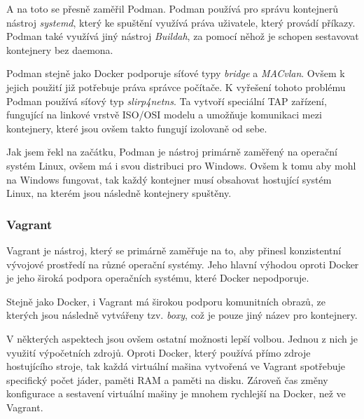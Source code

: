 A na toto se přesně zaměřil Podman. Podman používá pro správu kontejnerů nástroj \textit{systemd}, který ke spuštění využívá práva uživatele, který provádí příkazy. Podman také využívá jiný nástroj \textit{Buildah}, za pomocí něhož je schopen sestavovat kontejnery bez daemona. \cite{podman}\cite{podman_vs_docker}

Podman stejně jako Docker podporuje síťové typy \textit{bridge} a \textit{MACvlan}. Ovšem k jejich použití již potřebuje práva správce počítače. K vyřešení tohoto problému Podman používá síťový typ \textit{slirp4netns}. Ta vytvoří speciální TAP zařízení, fungující na linkové vrstvě ISO/OSI modelu a umožňuje komunikaci mezi kontejnery, které jsou ovšem takto fungují izolovaně od sebe. \cite{podman_network}

Jak jsem řekl na začátku, Podman je nástroj primárně zaměřený na operační systém Linux, ovšem má i svou distribuci pro Windows. Ovšem k tomu aby mohl na Windows fungovat, tak každý kontejner musí obsahovat hostující systém Linux, na kterém jsou následně kontejnery spuštěny. \cite{podman_vs_docker}

\subsubsection{Vagrant}

Vagrant je nástroj, který se primárně zaměřuje na to, aby přinesl konzistentní vývojové prostředí na různé operační systémy. Jeho hlavní výhodou oproti Docker je jeho široká podpora operačních systému, které Docker nepodporuje. 

Stejně jako Docker, i Vagrant má širokou podporu komunitních obrazů, ze kterých jsou následně vytvářeny tzv. \textit{boxy}, což je pouze jiný název pro kontejnery.\cite{vargrant_vs_docker}

V některých aspektech jsou ovšem ostatní možnosti lepší volbou. Jednou z nich je využití výpočetních zdrojů. Oproti Docker, který používá přímo zdroje hostujícího stroje, tak každá virtuální mašina vytvořená ve Vagrant spotřebuje specifický počet jáder, paměti RAM a paměti na disku. Zároveň čas změny konfigurace a sestavení virtuální mašiny je mnohem rychlejší na Docker, než ve Vagrant.\cite{madapparambath_2022}
